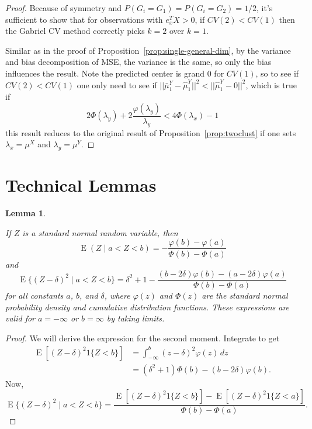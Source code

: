 \documentclass[12pt]{article}
\newtheorem{lemma}{Lemma}
\newcommand{\E}{\operatorname{E}}
\begin{document}
\begin{proof}
Because of symmetry and $P(G_i=G_1) = P(G_i=G_2) = 1/2$, it's sufficient to show that for observations with  $e^T_x X > 0$, if $CV(2) < CV(1)$ then the Gabriel CV method correctly picks $k=2$ over $k=1$. 

Similar as in the proof of Proposition~\ref{prop:single-general-dim}, by the variance and bias decomposition of MSE, the variance is the same, so only the bias influences the result. Note the predicted center is grand $0$ for $CV(1)$, so to see if  $CV(2) < CV(1)$ one only need to see if $||\bar{\mu}^Y_1-\hat{\mu}^Y_1||^2 < ||\hat{\mu}^Y_1 - 0||^2$, which is true if 
\[ 2\Phi(\lambda_y) + 2 \frac{\varphi(\lambda_y)}{\lambda_y} < 4\Phi(\lambda_x)-1 \] 
this result reduces to the original result of Proposition~\ref{prop:twoclust}
if one sets $\lambda_x = \mu^X$ and $\lambda_y = \mu^Y$.
\end{proof}



\section{Technical Lemmas}
\label{app:technical-lemmas}

\begin{lemma}\label{lem:truncated-normal-moments}

If $Z$ is a standard normal random variable, then
\[
  \E(Z \mid a < Z < b)
    = - \frac{\varphi(b) - \varphi(a)}
             {\Phi(b) - \Phi(a)}
\]
and
\[
  \E\{(Z - \delta)^2 \mid a < Z < b\}
    = \delta^2 + 1
    - \frac{  (b - 2 \delta) \varphi(b)
            - (a - 2 \delta) \varphi(a)}
           {\Phi(b) - \Phi(a)}
\]
for all constants $a$, $b$, and $\delta$, where $\varphi(z)$ and $\Phi(z)$ are
the standard normal probability density and cumulative distribution functions.
These expressions are valid for $a = -\infty$ or $b = \infty$ by taking
limits.

\end{lemma}
\begin{proof}
We will derive the expression for the second moment.  Integrate to get
\begin{align*}
  \E[ (Z - \delta)^2 1\{Z < b\}]
    &= \int_{-\infty}^b (z - \delta)^2 \varphi(z) \, dz \\
    &= (\delta^2 + 1) \Phi(b) - (b - 2 \delta) \varphi(b).
\end{align*}
Now,
\[
  \E\{(Z - \delta)^2 \mid a < Z < b\}
    =
    \frac{  \E[ (Z - \delta)^2 1\{Z < b\}]
          - \E[ (Z - \delta)^2 1\{Z < a\}]}
         { \Phi(b) - \Phi(a) }.
\]
\end{proof}
\end{document}
